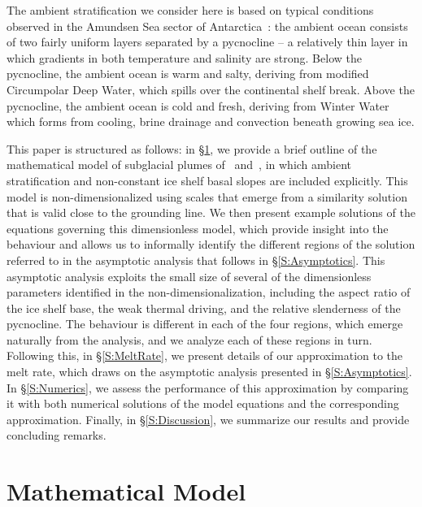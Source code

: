 \documentclass{jfm}
\begin{document}
The ambient stratification we consider here is based on typical conditions observed in the Amundsen Sea sector of Antarctica~\cite{Jenkins2018NatureGeo}: the ambient ocean consists of two fairly uniform layers separated by a pycnocline -- a relatively thin layer in which gradients in both temperature and salinity are strong. Below the pycnocline, the ambient ocean is warm and salty, deriving from modified Circumpolar Deep Water,  which spills over the continental shelf break. Above the pycnocline, the ambient ocean is cold and fresh, deriving from Winter Water which forms from cooling, brine drainage and convection beneath growing sea ice.

This paper is structured as follows: in \S\ref{S:Model}, we provide a brief outline of the mathematical model of subglacial plumes of~\cite{Jenkins1991JGeophysResOceans} and~\cite{Jenkins2011JPhysOcean}, in which ambient stratification and non-constant ice shelf basal slopes are included explicitly. This model is non-dimensionalized using scales that emerge from a similarity solution that is valid close to the grounding line. We then present example solutions of the equations governing this dimensionless model, which provide insight into the behaviour and allows us to informally identify the different regions of the solution referred to in the asymptotic analysis that follows in \S\ref{S:Asymptotics}. This asymptotic analysis exploits the small size of several of the dimensionless parameters identified in the non-dimensionalization, including the aspect ratio of the ice shelf base, the weak thermal driving, and the relative slenderness of the pycnocline. The behaviour is different in each of the four regions, which emerge naturally from the analysis, and we analyze each of these regions in turn. Following this, in \S\ref{S:MeltRate}, we present details of our approximation to the melt rate, which draws on the asymptotic analysis presented in \S\ref{S:Asymptotics}. In \S\ref{S:Numerics}, we assess the performance of this approximation by comparing it with both numerical solutions of the model equations and the corresponding~\cite{Lazeroms2019JPhysOcean} approximation. Finally, in \S\ref{S:Discussion}, we summarize our results and provide concluding remarks. 

\section{Mathematical Model}\label{S:Model}
\end{document}
